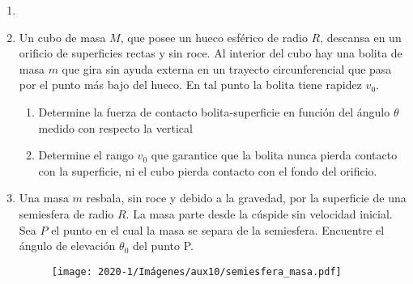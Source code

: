 \documentclass[letterpaper,11pt]{article}
\begin{document}
\vspace{-1cm}
\begin{enumerate}\setlength{\itemsep}{0.4cm}


\item[]

\item Un cubo de masa $M$, que posee un hueco esférico de radio $R$, descansa en un orificio de superficies rectas y sin roce. Al interior del cubo hay una bolita de masa $m$ que gira sin ayuda externa en un trayecto circunferencial que pasa por el punto más bajo del hueco. En tal punto la bolita tiene rapidez $v_0$.

    \begin{enumerate}
        \item Determine la fuerza de contacto bolita-superficie en función del ángulo $\theta$ medido con respecto la vertical
        
        \item Determine el rango $v_0$ que garantice que la bolita nunca pierda contacto con la superficie, ni el cubo pierda contacto con el fondo del orificio.
    \end{enumerate}
    
\begin{figure}[H]
    \centering
    
\end{figure}

\item Una masa $m$ resbala, sin roce y debido a la gravedad, por la superficie de una semiesfera de radio $R$. La masa parte desde la cúspide sin velocidad inicial. Sea $P$ el punto en el cual la masa se separa de la semiesfera. Encuentre el ángulo de elevación $\theta_0$ del punto P.

\begin{figure}[h!]
    \centering
    \texttt{[image: 2020-1/Imágenes/aux10/semiesfera\_masa.pdf]}
\end{figure}

%   

\end{enumerate}
\end{document}
